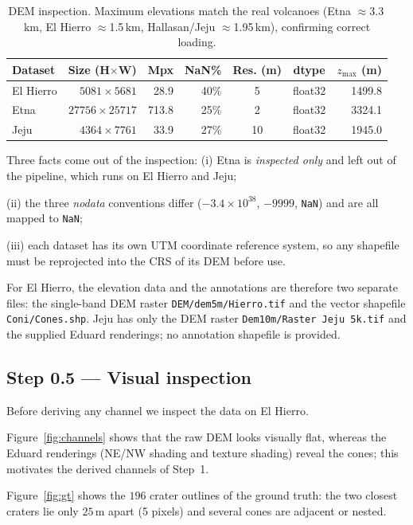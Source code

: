 \documentclass[11pt]{article}
\begin{document}
\begin{table}[h]
\centering
\begin{tabular}{l r r r c c r}
\hline
Dataset & Size (H$\times$W) & Mpx & NaN\% & Res. (m) & dtype & $z_{\max}$ (m)\\
\hline
El Hierro & $5081\times5681$ & 28.9 & 40\% & 5 & float32 & 1499.8\\
Etna      & $27756\times25717$ & 713.8 & 25\% & 2 & float32 & 3324.1\\
Jeju      & $4364\times7761$ & 33.9 & 27\% & 10 & float32 & 1945.0\\
\hline
\end{tabular}
\caption{DEM inspection. Maximum elevations match the real volcanoes
(Etna $\approx$3.3\,km, El Hierro $\approx$1.5\,km, Hallasan/Jeju
$\approx$1.95\,km), confirming correct loading.}
\label{tab:dems}
\end{table}

Three facts come out of the inspection: (i) Etna is \emph{inspected only} and left
out of the pipeline, which runs on El Hierro and Jeju;

(ii) the three \emph{nodata} conventions differ ($-3.4\times10^{38}$, $-9999$,
\texttt{NaN}) and are all mapped to \texttt{NaN};

(iii) each dataset has its own UTM coordinate reference system, so any shapefile
must be reprojected into the CRS of its DEM before use.

For El Hierro, the elevation data and the annotations are therefore two separate files:
the single-band DEM raster \texttt{DEM/dem5m/Hierro.tif} and the vector shapefile
\texttt{Coni/Cones.shp}.
Jeju has only the DEM raster \texttt{Dem10m/Raster Jeju 5k.tif} and the supplied
Eduard renderings; no annotation shapefile is provided.

\subsection{Step 0.5 --- Visual inspection}
Before deriving any channel we inspect the data on El Hierro.

Figure~\ref{fig:channels} shows that the raw DEM looks visually flat, whereas the Eduard
renderings (NE/NW shading and texture shading) reveal the cones; this motivates the derived
channels of Step~1.

Figure~\ref{fig:gt} shows the $196$ crater outlines of the ground truth: the two closest
craters lie only $25$\,m apart (5 pixels) and several cones are adjacent or nested.
\end{document}
